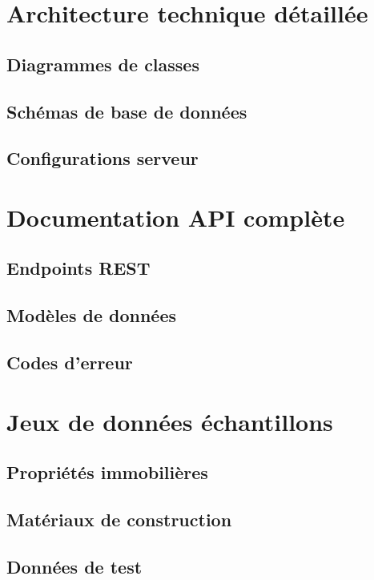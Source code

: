 \documentclass[12pt,a4paper]{report}
\begin{document}
\appendix

\chapter{Architecture technique détaillée}

\section{Diagrammes de classes}
\section{Schémas de base de données}
\section{Configurations serveur}

\chapter{Documentation API complète}

\section{Endpoints REST}
\section{Modèles de données}
\section{Codes d'erreur}

\chapter{Jeux de données échantillons}

\section{Propriétés immobilières}
\section{Matériaux de construction}
\section{Données de test}
\end{document}
